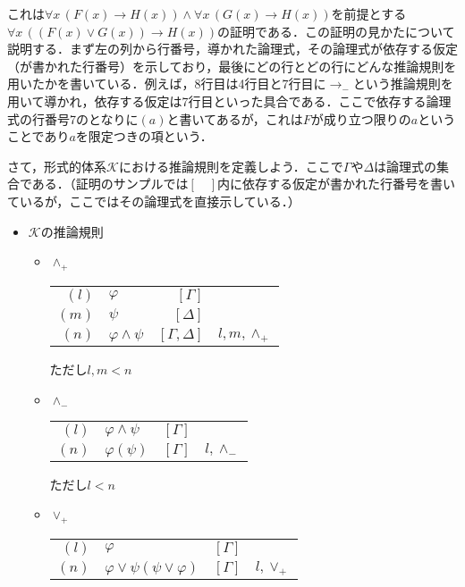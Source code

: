 \documentclass[10pt,b5paper,papersize,dvipdfmx]{jsbook}
\newcommand\fal[1]{\forall#1\,}
\begin{document}
これは$\fal{x} (F(x) \to H(x)) \land \fal{x} (G(x) \to H(x))$を前提とする$\fal{x} ((F(x) \lor G(x)) \to H(x))$の証明である．この証明の見かたについて説明する．まず左の列から行番号，導かれた論理式，その論理式が依存する仮定（が書かれた行番号）を示しており，最後にどの行とどの行にどんな推論規則を用いたかを書いている．例えば，8行目は4行目と7行目に$\to_-$という推論規則を用いて導かれ，依存する仮定は7行目といった具合である．ここで依存する論理式の行番号7のとなりに$(a)$と書いてあるが，これは$F$が成り立つ限りの$a$ということであり$a$を限定つきの項という．\par
さて，形式的体系$\mathcal K$における推論規則を定義しよう．ここで$\Gamma$や$\Delta$は論理式の集合である．（証明のサンプルでは$[\quad]$内に依存する仮定が書かれた行番号を書いているが，ここではその論理式を直接示している．）
\begin{itemize}
  \item $\mathcal K$の推論規則
  \begin{itemize}
    \item $\land_+$
      \begin{table}[H]
        \centering
        \begin{tabular}{rlrl}
          $(l)$ & $\varphi$ & $[\Gamma]$ &  \\
          $(m)$ & $\psi$ & $[\Delta]$ &  \\
          $(n)$ & $\varphi \land \psi$ & $[\Gamma,\Delta]$ & $l,m,\land_+$
        \end{tabular}
      \end{table}
      ただし$l,m<n$
    \item $\land_-$
      \begin{table}[H]
        \centering
        \begin{tabular}{rlrl}
          $(l)$ & $\varphi \land \psi$ & $[\Gamma]$ &  \\
          $(n)$ & $\varphi (\psi)$ & $[\Gamma]$ & $l,\land_-$ \\
        \end{tabular}
      \end{table}
      ただし$l<n$
    \item $\lor_+$
      \begin{table}[H]
        \centering
        \begin{tabular}{rlrl}
          $(l)$&$\varphi$&$[\Gamma]$& \\
          $(n)$&$\varphi \lor \psi (\psi \lor \varphi)$&$[\Gamma]$&$l,\lor_+$
        \end{tabular}
      \end{table}

\end{itemize}
\end{itemize}
\end{document}
